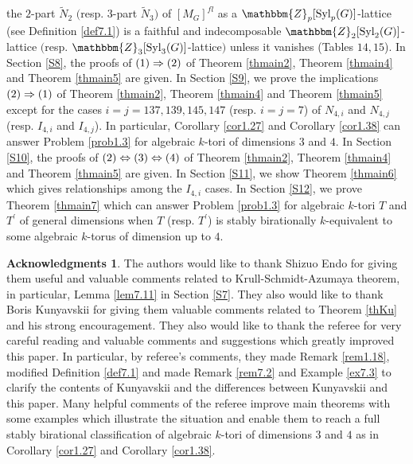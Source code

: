 \documentclass{amsart}
\theoremstyle{plain}
\theoremstyle{definition}
\newtheorem*{acknowledgments}{Acknowledgments}
\theoremstyle{remark}
\newcommand{\bZ}{\mathbbm{Z}}\newcommand{\bQ}{\mathbbm{Q}}
\newcommand{\Syl}{{\rm Syl}}
\begin{document}
the $2$-part $\widetilde{N}_2$ $($resp. $3$-part $\widetilde{N}_3$$)$ 
of $[M_G]^{fl}$ as a $\bZ_p[\Syl_p(G)]$-lattice (see Definition \ref{def7.1}) 
is a faithful and indecomposable $\bZ_2[\Syl_2(G)]$-lattice 
$($resp. $\bZ_3[\Syl_3(G)]$-lattice$)$ unless it vanishes 
(Tables $14, 15$). 
%
In Section \ref{S8}, 
the proofs of ${\rm (1)}\Rightarrow {\rm (2)}$ 
of {Theorem \ref{thmain2}}, {Theorem \ref{thmain4}} 
and {Theorem \ref{thmain5}} are given. 
%
In Section \ref{S9}, 
we prove the implications ${\rm (2)}\Rightarrow {\rm (1)}$ of 
{Theorem \ref{thmain2}}, {Theorem \ref{thmain4}} and 
{Theorem \ref{thmain5}} 
except for the cases $i=j=137,139,145,147$ (resp. $i=j=7$) 
of $N_{4,i}$ and $N_{4,j}$ (resp. $I_{4,i}$ and $I_{4,j}$). 
In particular, Corollary \ref{cor1.27} and Corollary \ref{cor1.38} 
can answer Problem \ref{prob1.3} for 
algebraic $k$-tori of dimensions $3$ and $4$. 
%
In Section \ref{S10}, 
the proofs of 
${\rm (2)}\Leftrightarrow {\rm (3)}\Leftrightarrow {\rm (4)}$ 
of {Theorem \ref{thmain2}}, {Theorem \ref{thmain4}} and 
{Theorem \ref{thmain5}} are given. 
%
In Section \ref{S11}, 
we show Theorem \ref{thmain6} 
which gives relationships among the $I_{4,i}$ cases. 
%
In Section \ref{S12}, 
we prove Theorem \ref{thmain7} which can answer Problem \ref{prob1.3} 
for algebraic $k$-tori $T$ and $T^\prime$ 
of general dimensions 
when $T$ (resp. $T^\prime$) is stably birationally $k$-equivalent 
to some algebraic $k$-torus of dimension up to $4$. 

\begin{acknowledgments}
The authors would like to thank Shizuo Endo 
for giving them useful and valuable comments 
related to Krull-Schmidt-Azumaya theorem, in particular, 
Lemma \ref{lem7.11} in Section \ref{S7}. 
%
They also would like to thank Boris Kunyavskii 
for giving them valuable comments related to 
Theorem \ref{thKu} and his strong encouragement. 
%
They also would like to thank the referee 
for very careful reading and valuable comments and suggestions 
which greatly improved this paper. 
In particular, by referee's comments, they made Remark \ref{rem1.18}, 
modified Definition \ref{def7.1} and made Remark \ref{rem7.2} and 
Example \ref{ex7.3} to clarify the contents of Kunyavskii \cite{Kun90} 
and the differences between Kunyavskii \cite{Kun90} and this paper. 
Many helpful comments of the referee improve main theorems with some examples 
which illustrate the situation and enable them to reach a full 
stably birational classification of algebraic $k$-tori of dimensions 
$3$ and $4$ as in Corollary \ref{cor1.27} and Corollary \ref{cor1.38}. 
\end{acknowledgments}
\end{document}
